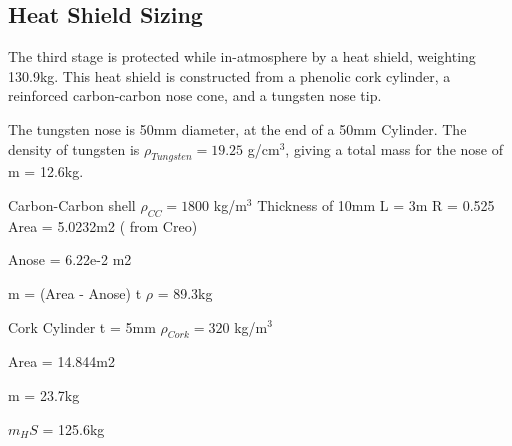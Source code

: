 		
		\subsection{Heat Shield Sizing}
		
			The third stage is protected while in-atmosphere by a heat shield, weighting 130.9kg. This heat shield is constructed from a phenolic cork cylinder, a reinforced carbon-carbon nose cone, and a tungsten nose tip. 
		
		
		The tungsten nose is 50mm diameter, at the end of a 50mm Cylinder. The density of tungsten is $\rho_{Tungsten} = 19.25$  g/cm$^3$, giving a total mass for the nose of m = 12.6kg.
		
		Carbon-Carbon shell
		$\rho_{CC} = 1800$  kg/m$^3$
		Thickness of 10mm
		L = 3m
		R = 0.525
		Area = 5.0232m2 ( from Creo)
		
		Anose = 6.22e-2 m2
		
		m = (Area - Anose) t $\rho$ = 89.3kg
		
		
		Cork Cylinder
		t = 5mm
		$\rho_{Cork} = 320$  kg/m$^3$
		
		Area = 14.844m2
		
		m = 23.7kg
		
		
		$m_HS$ = 125.6kg
		